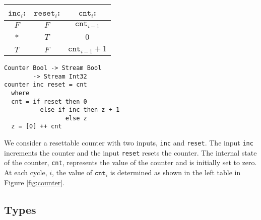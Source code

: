 \begin{figure*}
\begin{minipage}{0.4\linewidth}
\begin{tabular}{c|c||c}
$\mathtt{inc}_i$: & $\mathtt{reset}_i$: & $\mathtt{cnt}_i$: \\
\hline
$F$ & $F$ & $\mathtt{cnt}_{i-1}$ \\
\hline
* & $T$ & $0$ \\
\hline
$T$ & $F$ & $\mathtt{cnt}_{i-1} + 1$ \\
\hline
\end{tabular}
\end{minipage}
\hspace{1cm}
\begin{minipage}{0.6\linewidth}
\begin{lstlisting}[frame=none]
Counter Bool -> Stream Bool 
        -> Stream Int32
counter inc reset = cnt
  where 
  cnt = if reset then 0
          else if inc then z + 1
                 else z
  z = [0] ++ cnt
\end{lstlisting}
\end{minipage}
\caption{A resettable counter. The specification is provided at the left and the
implementation is provided at the right.
}
\label{fig:counter}
\end{figure*}

\begin{example}
We consider a resettable counter with two inputs, {\tt inc} and {\tt reset}.
The input {\tt inc} increments the counter and the input {\tt reset} resets the
counter. The internal state of the counter, {\tt cnt}, represents the value of the
counter and is initially set to zero. At each cycle, $i$, the value of
$\mathtt{cnt}_i$ is determined as shown in the left table in Figure
\ref{fig:counter}.
\end{example}


\subsection{Types} \label{sec:types}

